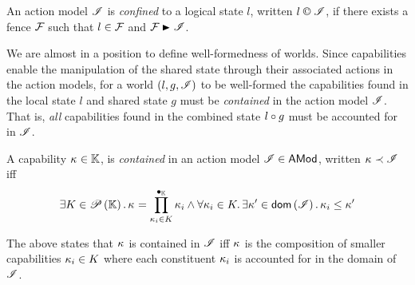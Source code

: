 %
%
\begin{definition}
An action model $\mathscr{I}$ is \emph{confined} to a logical state $l$, written $l\containI\lmod$, if there exists a fence $\mathcal{F}_{}$ such that $l\in\mathcal{F}_{}$ and $\fence{}\strictfences{}\lmod$.
\end{definition}
%
%
We are almost in a position to define well-formedness of worlds. Since capabilities enable the manipulation of the shared state through their associated actions in the action models, for a world $(l, g, \mathscr{I})$ to be well-formed the capabilities found in the local state $l$ and shared state $g$ must be \emph{contained} in the action model $\mathscr{I}$. That is, \emph{all} capabilities found in the combined state $l \circ g$ must be accounted for in $\mathscr{I}$. 
%
%
\begin{definition}
A capability $\kappa_{} \in \mathbb{K}$, is \emph{contained} in an action model $\mathscr{I} \in \textsf{AMod}$, written $\kappa_{} \prec \mathscr{I}$ iff 
%
\[
	\exists K \in \mathscr{P}\left(\mathbb{K} \right).\, \kappa_{} = \prod\limits_{\kappa_{i} \in K}^{\bullet_{\mathbb{K}}} \kappa_{i} \land \forall \kappa_{i} \in K.\, \exists \kappa_{}' \in \textsf{dom}\left( \mathscr{I} \right).\, \kappa_{i} \leq \kappa_{}'
\]
%
\end{definition}
%
%
The above states that $\kappa_{}$ is contained in $\mathscr{I}$ iff $\kappa_{}$ is the composition of smaller capabilities $\kappa_{i} \in K$ where each constituent $\kappa_{i}$ is accounted for in the domain of $\mathscr{I}$.
%
%


